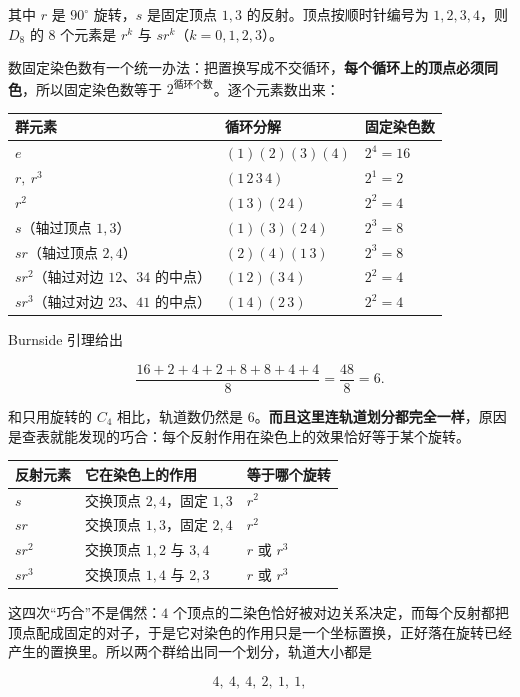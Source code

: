 其中 $r$ 是 $90^\circ$ 旋转，$s$ 是固定顶点 $1,3$ 的反射。顶点按顺时针编号为 $1,2,3,4$，则 $D_8$ 的 $8$ 个元素是 $r^k$ 与 $sr^k$（$k=0,1,2,3$）。

数固定染色数有一个统一办法：把置换写成不交循环，\textbf{每个循环上的顶点必须同色}，所以固定染色数等于 $2^{\text{循环个数}}$。逐个元素数出来：


\begin{center}
\begin{tabular}{lll}
群元素 & 循环分解 & 固定染色数\\ \hline
$e$ & $(1)(2)(3)(4)$ & $2^4=16$\\
$r,\ r^3$ & $(1\,2\,3\,4)$ & $2^1=2$\\
$r^2$ & $(1\,3)(2\,4)$ & $2^2=4$\\
$s$（轴过顶点 $1,3$） & $(1)(3)(2\,4)$ & $2^3=8$\\
$sr$（轴过顶点 $2,4$） & $(2)(4)(1\,3)$ & $2^3=8$\\
$sr^2$（轴过对边 $12$、$34$ 的中点） & $(1\,2)(3\,4)$ & $2^2=4$\\
$sr^3$（轴过对边 $23$、$41$ 的中点） & $(1\,4)(2\,3)$ & $2^2=4$
\end{tabular}
\end{center}


Burnside 引理给出

\[
\frac{16+2+4+2+8+8+4+4}{8}=\frac{48}{8}=6.
\]

和只用旋转的 $C_4$ 相比，轨道数仍然是 $6$。\textbf{而且这里连轨道划分都完全一样}，原因是查表就能发现的巧合：每个反射作用在染色上的效果恰好等于某个旋转。


\begin{center}
\begin{tabular}{lll}
反射元素 & 它在染色上的作用 & 等于哪个旋转\\ \hline
$s$ & 交换顶点 $2,4$，固定 $1,3$ & $r^2$\\
$sr$ & 交换顶点 $1,3$，固定 $2,4$ & $r^2$\\
$sr^2$ & 交换顶点 $1,2$ 与 $3,4$ & $r$ 或 $r^3$\\
$sr^3$ & 交换顶点 $1,4$ 与 $2,3$ & $r$ 或 $r^3$
\end{tabular}
\end{center}


这四次“巧合”不是偶然：$4$ 个顶点的二染色恰好被对边关系决定，而每个反射都把顶点配成固定的对子，于是它对染色的作用只是一个坐标置换，正好落在旋转已经产生的置换里。所以两个群给出同一个划分，轨道大小都是

\[
4,\ 4,\ 4,\ 2,\ 1,\ 1,
\]

